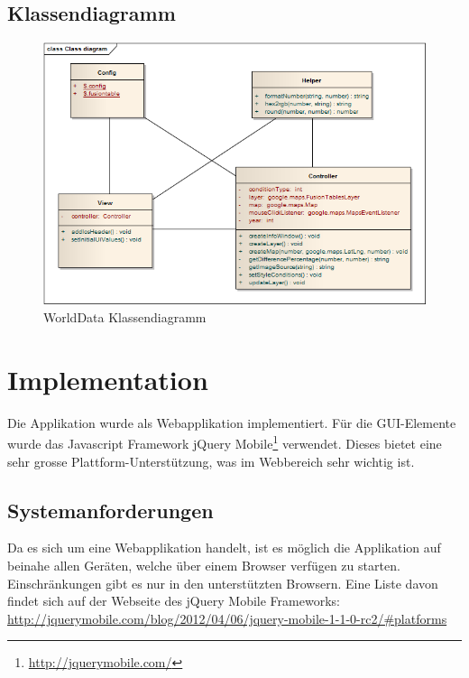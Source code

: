 \subsection{Klassendiagramm}
\begin{figure}[H]
	\centering
	\includegraphics[scale=0.7]{images/usecase1-worlddata/uml/worlddata-classdiagram.png}
	\caption{WorldData Klassendiagramm}
	\label{worlddata-classdiagram}
\end{figure}

\section{Implementation}
Die Applikation wurde als Webapplikation implementiert. Für die GUI-Elemente wurde das Javascript Framework jQuery Mobile\footnote{\url{http://jquerymobile.com/}} verwendet. Dieses bietet eine sehr grosse Plattform-Unterstützung, was im Webbereich sehr wichtig ist.

\subsection{Systemanforderungen}
Da es sich um eine Webapplikation handelt, ist es möglich die Applikation auf beinahe allen Geräten, welche über einem Browser verfügen zu starten. Einschränkungen gibt es nur in den unterstützten Browsern. Eine Liste davon findet sich auf der Webseite des jQuery Mobile Frameworks:  \url{http://jquerymobile.com/blog/2012/04/06/jquery-mobile-1-1-0-rc2/#platforms}

